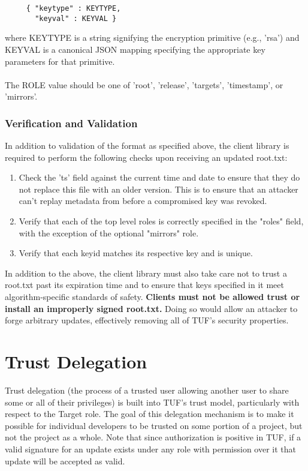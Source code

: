 \documentclass{letter}
\begin{document}
\begin{verbatim}
     { "keytype" : KEYTYPE,
       "keyval" : KEYVAL }
\end{verbatim}

where KEYTYPE is a string signifying the encryption primitive (e.g., 'rsa') and
KEYVAL is a canonical JSON mapping specifying the appropriate key parameters for
that primitive.
\\\\
The ROLE value should be one of 'root', 'release', 'targets', 'timestamp', or
'mirrors'.

\subsubsection{Verification and Validation}
In addition to validation of the format as specified above, the client library 
is required to perform the following checks upon receiving an updated root.txt:

\begin{enumerate}
        \item Check the 'ts' field against the current time and date
                to ensure that they do not replace this file with an older version.
                This is to ensure that an attacker can't replay metadata from
                before a compromised key was revoked.
        \item Verify that each of the top level roles is correctly 
                specified in the "roles" field, with the exception of the 
                optional "mirrors" role.
        \item Verify that each keyid matches its respective key and is unique.
\end{enumerate}

In addition to the above, the client library must also take care not to trust a root.txt past 
its expiration time and to ensure that keys specified in it meet algorithm-specific
standards of safety. \textbf{Clients must not be allowed trust or install an improperly signed root.txt.}
Doing so would allow an attacker to forge arbitrary updates, effectively removing
all of TUF's security properties.

\section{Trust Delegation}
Trust delegation (the process of a trusted user allowing another user to share
some or all of their privileges) is built into TUF's trust model, particularly
with respect to the Target role. The goal of this delegation mechanism is to
make it possible for individual developers to be trusted on some portion of a
project, but not the project as a whole. Note that since authorization is positive
in TUF, if a valid signature for an update exists under any role with permission 
over it that update will be accepted as valid.
\end{document}
